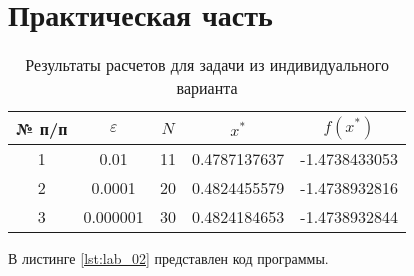 \documentclass{bmstu}
\begin{document}


\chapter{Практическая часть}

\begin{table}[H]
    \centering
	\caption{Результаты расчетов для задачи из индивидуального варианта}
    \label{tbl:task}
	\begin{tabular}{|c|c|c|c|c|}
        \hline
        № п/п & $\varepsilon$ & $N$ & $x^*$ & $f(x^*)$ \\ \hline
        1 & 0.01 & 11 & 0.4787137637 & -1.4738433053 \\ \hline
        2 & 0.0001 & 20 & 0.4824455579 & -1.4738932816 \\ \hline
        3 & 0.000001 & 30 & 0.4824184653 & -1.4738932844 \\ \hline
    \end{tabular}
\end{table}

В листинге \ref{lst:lab_02} представлен код программы.

\end{document}
